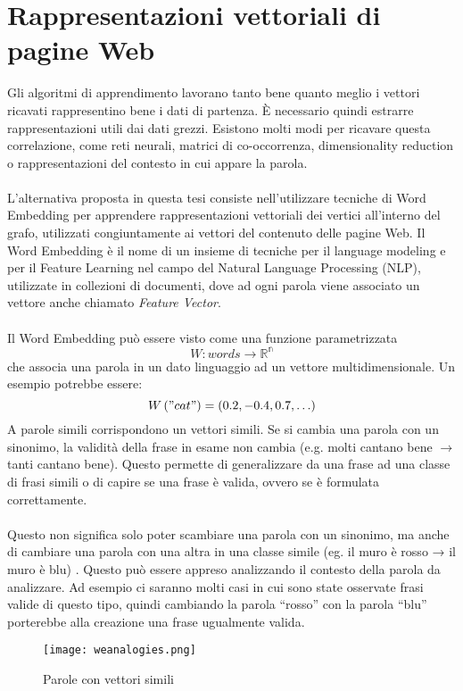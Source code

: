 \section{Rappresentazioni vettoriali di pagine Web}
Gli algoritmi di apprendimento lavorano tanto bene quanto meglio i vettori ricavati rappresentino bene i dati di partenza. È necessario quindi estrarre rappresentazioni utili dai dati grezzi. Esistono molti modi per ricavare questa correlazione, come reti neurali, matrici di co-occorrenza, dimensionality reduction o rappresentazioni del contesto in cui appare la parola. 
\\\\
L'alternativa proposta in questa tesi consiste nell'utilizzare tecniche di Word Embedding per apprendere rappresentazioni vettoriali dei vertici all'interno del grafo, utilizzati congiuntamente ai vettori del contenuto delle pagine Web.
Il Word Embedding è il nome di un insieme di tecniche per il language modeling e per il Feature Learning nel campo del Natural Language Processing (NLP)\cite{Bengio03}, utilizzate  in collezioni di documenti, dove ad ogni parola viene associato un vettore anche chiamato \textit{Feature Vector}. 
\\\\
Il Word Embedding può essere visto come una funzione parametrizzata 
\begin{equation}
  W : words \to \mathbb{R^n}
\end{equation}
che associa una parola in un dato linguaggio ad un vettore multidimensionale. Un esempio potrebbe essere:
\begin{equation}
  W\left ( "cat" \right ) = \left ( 0.2, -0.4, 0.7, \ldots \right )
\end{equation}
A parole simili corrispondono un vettori simili. Se si cambia una parola con un sinonimo, la validità della frase in esame non cambia (e.g. molti cantano bene $\to$ tanti cantano bene). Questo permette di generalizzare da una frase ad una classe di frasi simili o di capire se una frase è valida, ovvero se  è formulata correttamente.  
\\\\
Questo non significa solo poter scambiare una parola con un sinonimo, ma anche di cambiare una parola con una altra in una classe simile (eg. il muro è rosso → il muro è blu) \cite{Collobert11}. Questo può essere appreso analizzando il contesto della parola da analizzare. Ad esempio ci saranno molti casi in cui sono state osservate frasi valide di questo tipo, quindi cambiando la parola “rosso” con la parola “blu” porterebbe alla creazione una frase ugualmente valida. 
\begin{figure}[htb]
	\centering
	\texttt{[image: weanalogies.png]}
	\caption{Parole con vettori simili}
	\label{similarwords}
\end{figure}

